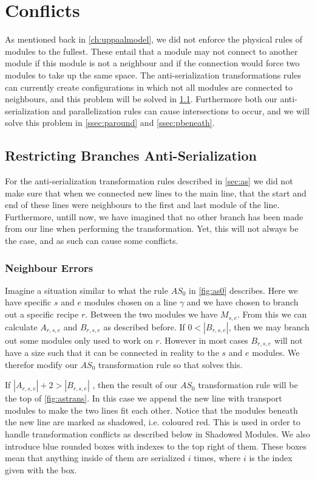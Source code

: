 \section{Conflicts}\label{ssec:conflicts}
As mentioned back in \cref{ch:uppaalmodel}, we did not enforce the physical rules of modules to the fullest. These entail that a module may not connect to another module if this module is not a neighbour and if the connection would force two modules to take up the same space. The anti-serialization transformations rules can currently create configurations in which not all modules are connected to neighbours, and this problem will be solved in \cref{ssec:restrictbranch}. Furthermore both our anti-serialization and parallelization rules can cause intersections to occur, and we will solve this problem in \cref{ssec:paround} and \cref{ssec:pbeneath}.


\subsection{Restricting Branches Anti-Serialization}\label{ssec:restrictbranch}
For the anti-serialization transformation rules described in \cref{sec:as} we did not make sure that when we connected new lines to the main line, that the start and end of these lines were neighbours to the first and last module of the line. Furthermore, untill now, we have imagined that no other branch has been made from our line when performing the transformation. Yet, this will not always be the case, and as such can cause some conflicts.

\subsubsection{Neighbour Errors}
Imagine a situation similar to what the rule $AS_0$ in \cref{fig:as0} describes. Here we have specific $s$ and $e$ modules chosen on a line $\gamma$ and we have chosen to branch out a specific recipe $r$. Between the two modules we have $M_{s,e}$. From this we can calculate $A_{r,s,e}$ and $B_{r,s,e}$ as described before. If $0 < |B_{r,s,e}|$, then we may branch out some modules only used to work on $r$. However in  most cases $B_{r,s,e}$ will not have a size such that it can be connected in reality to the $s$ and $e$ modules. We therefor modify our $AS_0$ transformation rule so that solves this.

If $|A_{r,s,e}| + 2 > |B_{r,s,e}|$ , then the result of our $AS_0$ transformation rule will be the top of \cref{fig:astrans}. In this case we append the new line with transport modules to make the two lines fit each other. Notice that the modules beneath the new line are marked as shadowed, i.e. coloured red. This is used in order to handle transformation conflicts as described below in Shadowed Modules. We also introduce blue rounded boxes with indexes to the top right of them. These boxes mean that anything inside of them are serialized $i$ times, where $i$ is the index given with the box. 


